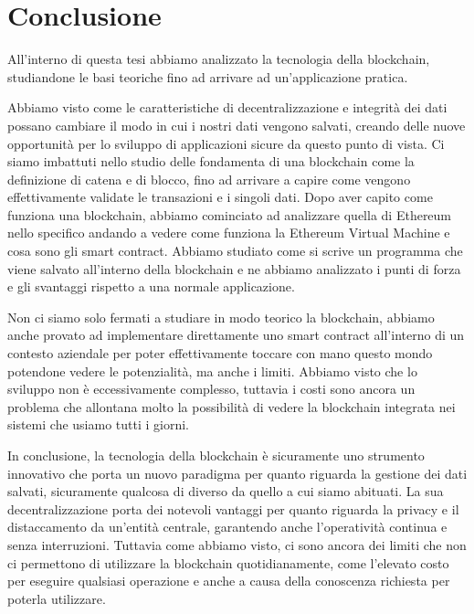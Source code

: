 \chapter{Conclusione}
\label{cha:conclusione}
All'interno di questa tesi abbiamo analizzato la tecnologia
della blockchain, studiandone le basi teoriche fino ad arrivare ad
un'applicazione pratica. 

Abbiamo visto come le caratteristiche di decentralizzazione e integrità dei dati
possano cambiare il modo in cui i nostri dati vengono salvati, creando delle
nuove opportunità per lo sviluppo di applicazioni sicure da questo punto di 
vista. Ci siamo imbattuti nello studio delle fondamenta di una blockchain come
la definizione di catena e di blocco, fino ad arrivare a capire come vengono
effettivamente validate le transazioni e i singoli dati. 
Dopo aver capito come funziona una blockchain, abbiamo cominciato ad analizzare
quella di Ethereum nello specifico andando a vedere come funziona la Ethereum
Virtual Machine e cosa sono gli smart contract. Abbiamo studiato come si scrive
un programma che viene salvato all'interno della blockchain e ne abbiamo analizzato
i punti di forza e gli svantaggi rispetto a una normale applicazione. 

Non ci siamo solo fermati a studiare in modo teorico la blockchain, abbiamo
anche provato ad implementare direttamente uno smart contract all'interno di 
un contesto aziendale per poter effettivamente toccare con mano questo mondo
potendone vedere le potenzialità, ma anche i limiti. Abbiamo visto che lo
sviluppo non è eccessivamente complesso, tuttavia i costi sono ancora un
problema che allontana molto la possibilità di vedere la blockchain integrata
nei sistemi che usiamo tutti i giorni.

In conclusione, la tecnologia della blockchain è sicuramente uno strumento 
innovativo che porta un nuovo paradigma per quanto riguarda la gestione dei dati
salvati, sicuramente qualcosa di diverso da quello a cui siamo abituati. 
La sua decentralizzazione porta dei notevoli vantaggi per quanto riguarda la
privacy e il distaccamento da un'entità centrale, garantendo anche l'operatività
continua e senza interruzioni. Tuttavia come abbiamo visto, ci sono ancora 
dei limiti che non ci permettono di utilizzare la blockchain quotidianamente,
come l'elevato costo per eseguire qualsiasi operazione e anche a causa della
conoscenza richiesta per poterla utilizzare.
